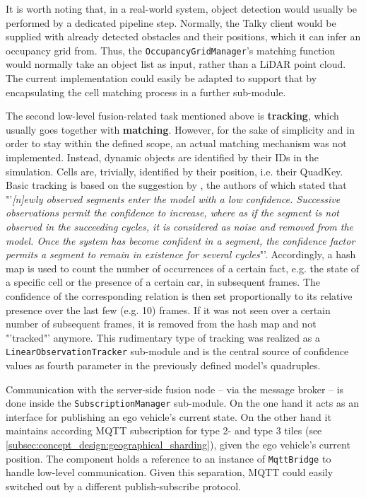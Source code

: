 It is worth noting that, in a real-world system, object detection would usually be performed by a dedicated pipeline step. Normally, the Talky client would be supplied with already detected obstacles and their positions, which it can infer an occupancy grid from. Thus, the \texttt{OccupancyGridManager}'s matching function would normally take an object list as input, rather than a LiDAR point cloud. The current implementation could easily be adapted to support that by encapsulating the cell matching process in a further sub-module.
\par
\bigskip

The second low-level fusion-related task mentioned above is \textbf{tracking}, which usually goes together with \textbf{matching}. However, for the sake of simplicity and in order to stay within the defined scope, an actual matching mechanism was not implemented. Instead, dynamic objects are identified by their IDs in the simulation. Cells are, trivially, identified by their position, i.e. their QuadKey. Basic tracking is based on the suggestion by \cite{Crowley1993}, the authors of which stated that "'\textit{[n]ewly observed segments enter the model with a low confidence. Successive observations permit the confidence to increase, where as if the segment is not observed in the succeeding cycles, it is considered as noise and removed from the model. Once the system has become confident in a segment, the confidence factor permits a segment to remain in existence for several cycles}"'. Accordingly, a hash map is used to count the number of occurrences of a certain fact, e.g. the state of a specific cell or the presence of a certain car, in subsequent frames. The confidence of the corresponding relation is then set proportionally to its relative presence over the last few (e.g. 10) frames. If it was not seen over a certain number of subsequent frames, it is removed from the hash map and not "'tracked"' anymore. This rudimentary type of tracking was realized as a \texttt{LinearObservationTracker} sub-module and is the central source of confidence values  as fourth parameter in the previously defined model's quadruples.
\par
\bigskip

Communication with the server-side fusion node – via the message broker – is done inside the \texttt{SubscriptionManager} sub-module. On the one hand it acts as an interface for publishing an ego vehicle's current state. On the other hand it maintains according MQTT subscription for type 2- and type 3 tiles (see \cref{subsec:concept_design:geographical_sharding}), given the ego vehicle's current position. The component holds a reference to an instance of \texttt{MqttBridge} to handle low-level communication. Given this separation, MQTT could easily switched out by a different publish-subscribe protocol. 

